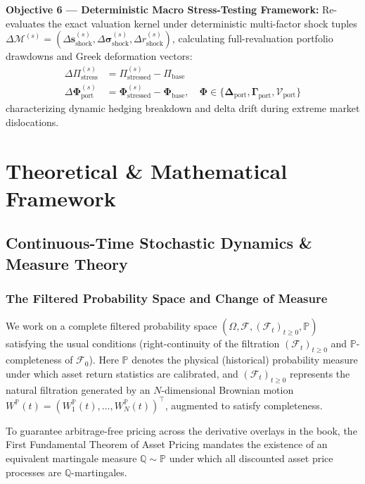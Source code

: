 \documentclass{article}
\theoremstyle{plain}
\theoremstyle{definition}
\theoremstyle{remark}
\begin{document}
\textbf{Objective 6 — Deterministic Macro Stress-Testing Framework:} Re-evaluates the exact valuation kernel under deterministic multi-factor shock tuples $\Delta \mathcal{M}^{(s)} = (\Delta \mathbf{s}_{\text{shock}}^{(s)}, \Delta \boldsymbol{\sigma}_{\text{shock}}^{(s)}, \Delta r_{\text{shock}}^{(s)})$, calculating full-revaluation portfolio drawdowns and Greek deformation vectors:
\begin{align}
    \Delta \Pi_{\text{stress}}^{(s)} &= \Pi_{\text{stressed}}^{(s)} - \Pi_{\text{base}} \\
    \Delta \boldsymbol{\Phi}_{\text{port}}^{(s)} &= \boldsymbol{\Phi}_{\text{stressed}}^{(s)} - \boldsymbol{\Phi}_{\text{base}}, \quad \boldsymbol{\Phi} \in \{ \boldsymbol{\Delta}_{\text{port}}, \mathbf{\Gamma}_{\text{port}}, \boldsymbol{\mathcal{V}}_{\text{port}} \}
\end{align}
characterizing dynamic hedging breakdown and delta drift during extreme market dislocations.

\section{Theoretical \& Mathematical Framework}

\subsection{Continuous-Time Stochastic Dynamics \& Measure Theory}

\subsubsection{The Filtered Probability Space and Change of Measure}
We work on a complete filtered probability space $(\Omega, \mathcal{F}, (\mathcal{F}_t)_{t \ge 0}, \mathbb{P})$ satisfying the usual conditions (right-continuity of the filtration $(\mathcal{F}_t)_{t \ge 0}$ and $\mathbb{P}$-completeness of $\mathcal{F}_0$). Here $\mathbb{P}$ denotes the physical (historical) probability measure under which asset return statistics are calibrated, and $(\mathcal{F}_t)_{t \ge 0}$ represents the natural filtration generated by an $N$-dimensional Brownian motion $W^\mathbb{P}(t) = (W_1^\mathbb{P}(t), \dots, W_N^\mathbb{P}(t))^\top$, augmented to satisfy completeness.

To guarantee arbitrage-free pricing across the derivative overlays in the book, the First Fundamental Theorem of Asset Pricing mandates the existence of an equivalent martingale measure $\mathbb{Q} \sim \mathbb{P}$ under which all discounted asset price processes are $\mathbb{Q}$-martingales.
\end{document}
